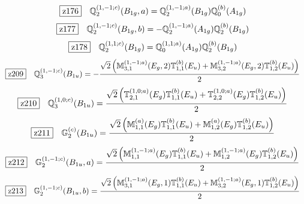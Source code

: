 \documentclass[fleqn,10pt,landscape]{jsarticle}
\begin{document}
\begin{dmath*}
\hspace*{3mm}\fbox{z176}\quad \mathbb{Q}_{2}^{(1,-1;c)}(B_{1g},a)=\mathbb{Q}_{2}^{(1,-1;a)}(B_{1g}) \mathbb{Q}_{0}^{(b)}(A_{1g})
\end{dmath*}
\begin{dmath*}
\hspace*{3mm}\fbox{z177}\quad \mathbb{Q}_{2}^{(1,-1;c)}(B_{1g},b)=- \mathbb{Q}_{2}^{(1,-1;a)}(A_{1g}) \mathbb{Q}_{2}^{(b)}(B_{1g})
\end{dmath*}
\begin{dmath*}
\hspace*{3mm}\fbox{z178}\quad \mathbb{Q}_{2}^{(1,1;c)}(B_{1g})=\mathbb{Q}_{0}^{(1,1;a)}(A_{1g}) \mathbb{Q}_{2}^{(b)}(B_{1g})
\end{dmath*}
\begin{dmath*}
\hspace*{3mm}\fbox{z209}\quad \mathbb{Q}_{3}^{(1,-1;c)}(B_{1u})=- \frac{\sqrt{2} \left(\mathbb{M}_{3,1}^{(1,-1;a)}(E_{g},2) \mathbb{T}_{1,1}^{(b)}(E_{u}) + \mathbb{M}_{3,2}^{(1,-1;a)}(E_{g},2) \mathbb{T}_{1,2}^{(b)}(E_{u})\right)}{2}
\end{dmath*}
\begin{dmath*}
\hspace*{3mm}\fbox{z210}\quad \mathbb{Q}_{3}^{(1,0;c)}(B_{1u})=\frac{\sqrt{2} \left(\mathbb{T}_{2,1}^{(1,0;a)}(E_{g}) \mathbb{T}_{1,1}^{(b)}(E_{u}) + \mathbb{T}_{2,2}^{(1,0;a)}(E_{g}) \mathbb{T}_{1,2}^{(b)}(E_{u})\right)}{2}
\end{dmath*}
\begin{dmath*}
\hspace*{3mm}\fbox{z211}\quad \mathbb{G}_{2}^{(c)}(B_{1u})=\frac{\sqrt{2} \left(\mathbb{M}_{1,1}^{(a)}(E_{g}) \mathbb{T}_{1,1}^{(b)}(E_{u}) + \mathbb{M}_{1,2}^{(a)}(E_{g}) \mathbb{T}_{1,2}^{(b)}(E_{u})\right)}{2}
\end{dmath*}
\begin{dmath*}
\hspace*{3mm}\fbox{z212}\quad \mathbb{G}_{2}^{(1,-1;c)}(B_{1u},a)=\frac{\sqrt{2} \left(\mathbb{M}_{1,1}^{(1,-1;a)}(E_{g}) \mathbb{T}_{1,1}^{(b)}(E_{u}) + \mathbb{M}_{1,2}^{(1,-1;a)}(E_{g}) \mathbb{T}_{1,2}^{(b)}(E_{u})\right)}{2}
\end{dmath*}
\begin{dmath*}
\hspace*{3mm}\fbox{z213}\quad \mathbb{G}_{2}^{(1,-1;c)}(B_{1u},b)=\frac{\sqrt{2} \left(\mathbb{M}_{3,1}^{(1,-1;a)}(E_{g},1) \mathbb{T}_{1,1}^{(b)}(E_{u}) + \mathbb{M}_{3,2}^{(1,-1;a)}(E_{g},1) \mathbb{T}_{1,2}^{(b)}(E_{u})\right)}{2}
\end{dmath*}
\end{document}
